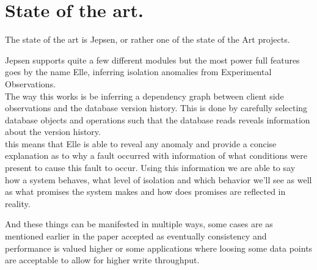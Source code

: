 \documentclass[a4paper,10pt,titlepage]{report}
\begin{document}
\section{State of the art.}

The state of the art is Jepsen, or rather one of the state of the Art projects.

Jepsen supports quite a few different modules but the most power full features goes by the name Elle, inferring isolation anomalies from Experimental Observations. \\
\vspace{5mm}
The way this works is be inferring a dependency graph between client side observations and the database version history. This is done by carefully selecting database objects and operations such that the database reads reveals information about the version history.\\
\vspace{5mm}
this means that Elle is able to reveal any anomaly and provide a concise explanation as to why a fault occurred with information of what conditions were present to cause this fault to occur. Using this information we are able to say how a system behaves, what level of isolation and which behavior we'll see as well as what promises the system makes and how does promises are reflected in reality.\\
\vspace{5mm}

And these things can be manifested in multiple ways, some cases are as mentioned earlier in the paper accepted as eventually consistency and performance is valued higher or some applications where loosing some data points are acceptable to allow for higher write throughput.\\
\vspace{5mm}
\end{document}
